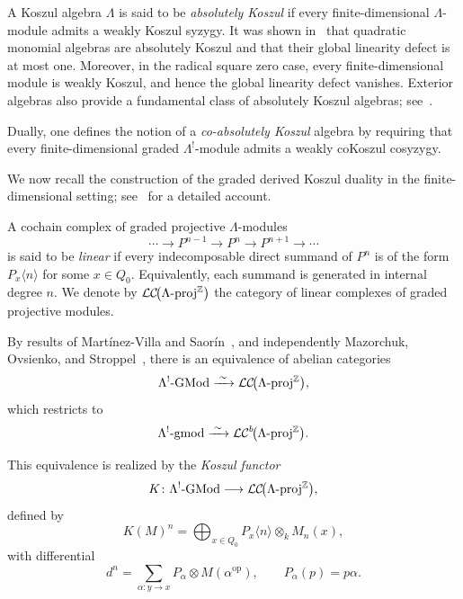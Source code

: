 \documentclass[11pt]{article}
\theoremstyle{definition}
\theoremstyle{remark}
\begin{document}
A Koszul algebra \(\Lambda\) is said to be \emph{absolutely Koszul} if every finite-dimensional \(\Lambda\)-module admits a weakly Koszul syzygy. It was shown in~\cite{5} that quadratic monomial algebras are absolutely Koszul and that their global linearity defect is at most one. Moreover, in the radical square zero case, every finite-dimensional module is weakly Koszul, and hence the global linearity defect vanishes. Exterior algebras also provide a fundamental class of absolutely Koszul algebras; see~\cite{11}.

\medskip

Dually, one defines the notion of a \emph{co-absolutely Koszul} algebra by requiring that every finite-dimensional graded $\Lambda^{!}$-module admits a weakly coKoszul cosyzygy.

\medskip 
We now recall the construction of the graded derived Koszul duality in the finite-dimensional setting; see~\cite{4} for a detailed account.

\medskip

A cochain complex of graded projective \(\Lambda\)-modules
\[
\cdots \longrightarrow P^{n-1} \longrightarrow P^{n} 
\longrightarrow P^{n+1} \longrightarrow \cdots
\]
is said to be \emph{linear} if every indecomposable direct summand of \(P^{n}\) is of the form \(P_{x}\langle n\rangle\) for some \(x \in Q_{0}\). Equivalently, each summand is generated in internal degree \(n\). We denote by
\( 
\mathcal{LC}\!\bigl(\Lambda\textup{-proj}^{\mathbb{Z}}\bigr)
\)
the category of linear complexes of graded projective modules.

By results of Martínez-Villa and Saorín~\cite[Theorem~2.4]{18}, and independently Mazorchuk, Ovsienko, and Stroppel~\cite[Theorem~12]{20}, there is an equivalence of abelian categories
\[
\Lambda^{!}\textup{-GMod}
\xrightarrow{\;\sim\;}
\mathcal{LC}\!\bigl(\Lambda\textup{-proj}^{\mathbb{Z}}\bigr),
\]
which restricts to
\[
\Lambda^{!}\textup{-gmod}
\xrightarrow{\;\sim\;}
\mathcal{LC}^{b}\!\bigl(\Lambda\textup{-proj}^{\mathbb{Z}}\bigr).
\]

This equivalence is realized by the \emph{Koszul functor}
\[
K \colon \Lambda^{!}\textup{-GMod} \longrightarrow
\mathcal{LC}\!\bigl(\Lambda\textup{-proj}^{\mathbb{Z}}\bigr),
\]
defined by
\[
K(M)^{n} = \bigoplus_{x \in Q_{0}} P_{x}\langle n \rangle \otimes_{k} M_{n}(x),
\]
with differential
\[
d^{n} = \sum_{\alpha\colon y \to x}
P_{\alpha} \otimes M(\alpha^{\operatorname{op}}),
\qquad P_{\alpha}(p)=p\alpha.
\]

\medskip
\end{document}
